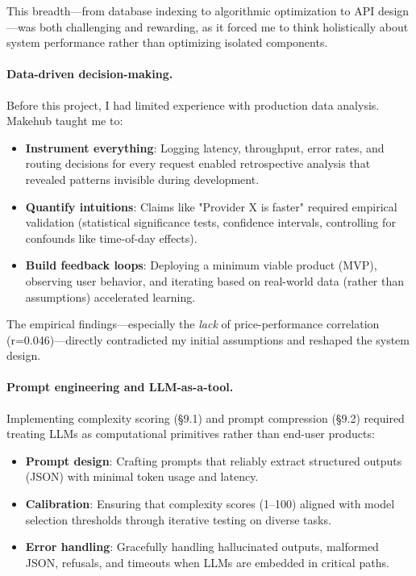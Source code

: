 \documentclass[english]{article}
\begin{document}
This breadth—from database indexing to algorithmic optimization to API design—was both challenging and rewarding, as it forced me to think holistically about system performance rather than optimizing isolated components.

\paragraph{Data-driven decision-making.}

Before this project, I had limited experience with production data analysis. Makehub taught me to:
\begin{itemize}
    \item \textbf{Instrument everything}: Logging latency, throughput, error rates, and routing decisions for every request enabled retrospective analysis that revealed patterns invisible during development.
    \item \textbf{Quantify intuitions}: Claims like "Provider X is faster" required empirical validation (statistical significance tests, confidence intervals, controlling for confounds like time-of-day effects).
    \item \textbf{Build feedback loops}: Deploying a minimum viable product (MVP), observing user behavior, and iterating based on real-world data (rather than assumptions) accelerated learning.
\end{itemize}

The empirical findings—especially the \emph{lack} of price-performance correlation (r=0.046)—directly contradicted my initial assumptions and reshaped the system design.

\paragraph{Prompt engineering and LLM-as-a-tool.}

Implementing complexity scoring (§9.1) and prompt compression (§9.2) required treating LLMs as computational primitives rather than end-user products:
\begin{itemize}
    \item \textbf{Prompt design}: Crafting prompts that reliably extract structured outputs (JSON) with minimal token usage and latency.
    \item \textbf{Calibration}: Ensuring that complexity scores (1--100) aligned with model selection thresholds through iterative testing on diverse tasks.
    \item \textbf{Error handling}: Gracefully handling hallucinated outputs, malformed JSON, refusals, and timeouts when LLMs are embedded in critical paths.
\end{itemize}
\end{document}
